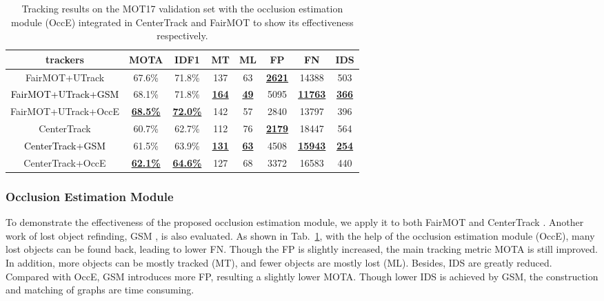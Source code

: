 \documentclass[final,1p,times,twocolumn]{elsarticle}
\newcommand{\tref}[1]{Tab.~\ref{#1}}
\begin{document}
	
	\begin{table}
		\caption{Tracking results on the MOT17 validation set with the occlusion estimation module (OccE) integrated in CenterTrack \cite{zhou2020tracking} and FairMOT \cite{zhang2020fairmot} to show its effectiveness respectively. }
		\setlength{\tabcolsep}{0.4mm}
		\centering
\scriptsize
		\begin{tabular}{c|c|c|c|c|c|c|c}
			\hline
			trackers  &MOTA &IDF1  &MT &ML &FP &FN  &IDS  \\
			\hline
			FairMOT+UTrack &67.6\% &71.8\% &137 &63 &\underline{\bf2621} &14388 &503 \\
			\textcolor{black}{FairMOT+UTrack+GSM \cite{liugsm}} &68.1\% &71.8\% &\underline{\bf164} & \underline{\bf49} &5095 &\underline{\bf11763} &\underline{\bf366} \\
			FairMOT+UTrack+OccE  &\underline{\bf68.5\%} &\underline{\bf72.0\%} &142 &57 &2840 &13797 &396 \\
			\hline
			CenterTrack &60.7\% &62.7\% &112 &76 &\underline{\bf2179} &18447 &564 \\
			\textcolor{black}{CenterTrack+GSM \cite{liugsm}} &61.5\% &63.9\% &\underline{\bf131} &\underline{\bf63} &4508 &\underline{\bf15943} &\underline{\bf254} \\
			CenterTrack+OccE  &\underline{\bf62.1\%} &\underline{\bf 64.6\%} &127 &68 &3372 &16583 &440 \\
			\hline
		\end{tabular}
		\label{table_occlusion_estimation_module}
	\end{table}	
	
	\subsubsection{Occlusion Estimation Module}
	\label{section_experiment_occlusion_estimation_module}
	To demonstrate the effectiveness of the proposed occlusion estimation module, we apply it to both FairMOT \cite{zhang2020fairmot} and CenterTrack \cite{zhou2020tracking}. Another work of lost object refinding, GSM \cite{liugsm}, is also evaluated.
	As shown in \tref{table_occlusion_estimation_module}, with the help of the occlusion estimation module (OccE), many lost objects can be found back, leading to lower FN. Though the FP is slightly increased, the main tracking metric MOTA is still improved. In addition, more objects can be mostly tracked (MT), and fewer objects are mostly lost (ML). Besides, IDS are greatly reduced. 
	Compared with OccE, GSM introduces more FP, resulting a slightly lower MOTA. Though lower IDS is achieved by GSM, the construction and matching of graphs are time consuming.
\end{document}
